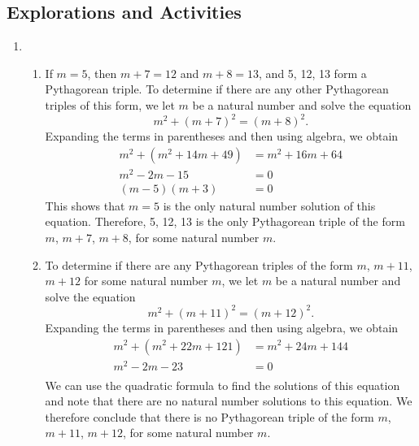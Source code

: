 \subsection*{Explorations and Activities}
\setcounter{oldenumi}{\theenumi}
\begin{enumerate} \setcounter{enumi}{\theoldenumi}
\item  \begin{enumerate}  \setcounter{enumii}{1}
\item If $m = 5$, then $m + 7 = 12$ and $m + 8 = 13$, and 5, 12, 13 form a Pythagorean triple.  To determine if there are any other Pythagorean triples of this form, we let $m$ be a natural number and solve the equation
\[
m^2 + (m + 7)^2 = (m + 8)^2.
\]
Expanding the terms in parentheses and then using algebra, we obtain
\begin{align*}
m^2 + \left( m^2 + 14m + 49 \right) &= m^2 + 16m + 64 \\
          m^2 - 2m - 15 &= 0 \\
          (m - 5)(m + 3) &= 0
\end{align*}
This shows that $m = 5$ is the only natural number solution of this equation.  Therefore, 5, 12, 13 is the only Pythagorean triple of the form $m$, $m + 7$, $m + 8$, for some natural number $m$.


\item To determine if there are any Pythagorean triples of the form $m$, $m + 11$, $m + 12$ for some natural number $m$, we let $m$ be a natural number and solve the equation
\[
m^2 + (m + 11)^2 = (m + 12)^2.
\]
Expanding the terms in parentheses and then using algebra, we obtain
\begin{align*}
m^2 + \left( m^2 + 22m + 121 \right) &= m^2 + 24m + 144 \\
          m^2 - 2m - 23 &= 0 \\
\end{align*}
We can use the quadratic formula to find the solutions of this equation and note that there are no natural number solutions to this equation.  We therefore conclude that there is no Pythagorean triple of the form $m$, $m + 11$, $m + 12$, for some natural number $m$.
\end{enumerate}
\end{enumerate}



